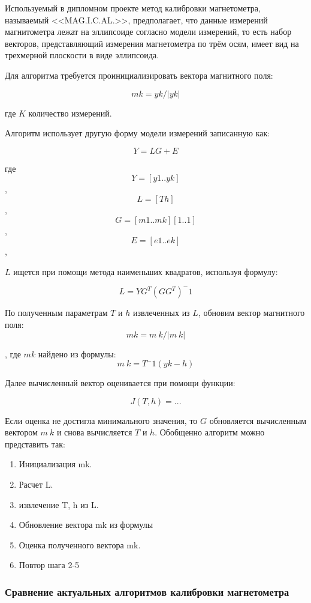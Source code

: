 Используемый в дипломном проекте метод калибровки магнетометра, называемый <<MAG.I.C.AL.>>, предполагает, что данные измерений магнитометра
лежат на эллипсоиде согласно модели измерений, то есть набор векторов, представляющий измерения магнетометра по трём осям, 
имеет вид на трехмерной плоскости в виде эллипсоида. %

Для алгоритма требуется проинициализировать вектора магнитного поля:

$$ mk = yk/|yk| $$

где $K$ количество измерений.

Алгоритм использует другую форму модели измерений записанную как:

$$ Y = LG + E $$

где
$$ Y = [y1..yk] $$,
$$ L = [T h] $$,
$$ G = [m1..mk][1..1] $$,
$$ E = [e1..ek] $$,

$L$ ищется при помощи метода наименьших квадратов, используя формулу:

$$ L=YG^T(GG^T)^-1$$

По полученным параметрам $T$ и $h$ извлеченных из $L$, обновим вектор магнитного поля:
$$ mk = m~k/|m~k| $$

, где $mk$ найдено из формулы:  
$$ m~k = T^-1(yk - h) $$

Далее вычисленный вектор оценивается при помощи функции:

$$ J(T, h) = ... $$

Если оценка не достигла минимального значения, то $G$ обновляется вычисленным вектором $m~k$ и снова вычисляется $T$ и $h$.
Обобщенно алгоритм можно представить так:
\begin{enumerate}
    \item Инициализация mk.
    \item Расчет L.
    \item извлечение T, h из L.
    \item Обновление вектора mk из формулы 
    \item Оценка полученного вектора mk.
    \item Повтор шага 2-5
\end{enumerate}

\subsubsection{Сравнение актуальных алгоритмов калибровки магнетометра}

